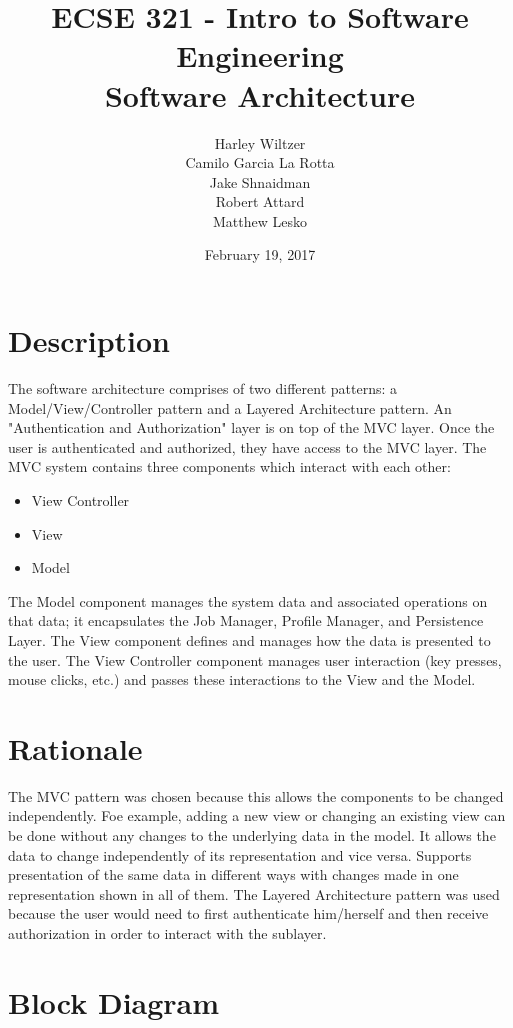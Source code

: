 \documentclass[12pt]{article}
\title{ECSE 321 - Intro to Software Engineering\\Software Architecture}
\author{Harley Wiltzer\\Camilo Garcia La Rotta\\Jake Shnaidman\\Robert Attard\\Matthew Lesko}
\date{February 19, 2017}
\begin{document}
\maketitle
\newpage
{} %
\tableofcontents
\section{Description}
	The software architecture comprises of two different patterns: a Model/View/Controller pattern and a Layered Architecture pattern. An "Authentication and Authorization" layer is on top of the MVC layer. Once the user is authenticated and authorized, they have access to the MVC layer. The MVC system contains three components which interact with each other: 
	\begin{itemize}
		\item View Controller
		\item View
		\item Model
	\end{itemize}
	The Model component manages the system data and associated operations on that data; it encapsulates the Job Manager, Profile Manager, and Persistence Layer. The View component defines and manages how the data is presented to the user. The View Controller component manages user interaction (key presses, mouse clicks, etc.) and passes these interactions to the View and the Model.
\section{Rationale}
	The MVC pattern was chosen because this allows the components to be changed independently. Foe example, adding a new view or changing an existing view can be done without any changes to the underlying data in the model. It allows the data to change independently of its representation and vice versa. Supports presentation of the same data in different ways with changes made in one representation shown in all of them.
	The Layered Architecture pattern was used because the user would need to first authenticate him/herself and then receive authorization in order to interact with the sublayer.
\section{Block Diagram}
\end{document}
